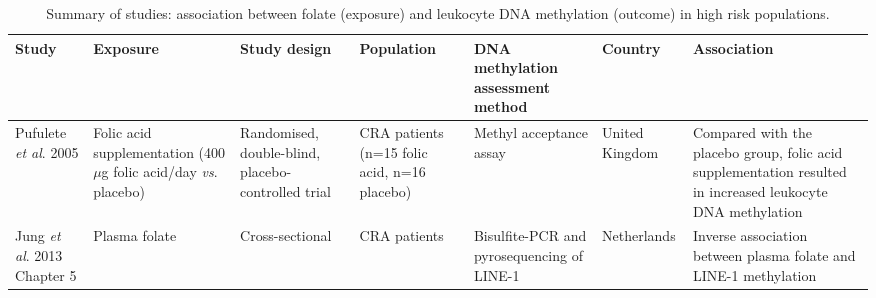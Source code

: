 \begin{sidewaystable}
\small
\caption{Summary of studies: association between folate (exposure) and leukocyte DNA methylation (outcome) in high risk populations.} 
\label{table7_6}
\renewcommand{\arraystretch}{1}
\begin{tabular}{L{2cm}C{2cm}C{2cm}C{2cm}C{2.5cm}C{1.5cm}C{3cm}} 
\hline\bfseries Study & \bfseries Exposure & \bfseries Study design & \bfseries Population & \bfseries DNA methylation assessment 
method & \bfseries Country & \bfseries Association\\
\hline

\parbox[t][3.6cm]{2cm}{\raggedright Pufulete \textit{et al}. 2005 \cite{c713}} &
\parbox[t][3.6cm]{2cm}{\centering Folic acid supplementation (400 $\mu$g folic acid/day \textit{vs}. placebo)} &
\parbox[t][3.6cm]{2cm}{\centering Randomised, double-blind, placebo-controlled trial} &
\parbox[t][3.6cm]{2cm}{ CRA patients (n=15 folic acid, n=16 placebo)} &
\parbox[t][3.6cm]{2.5cm}{\centering Methyl acceptance assay} &
\parbox[t][3.6cm]{1.5cm}{\centering United Kingdom} &
\parbox[t][3.6cm]{3cm}{\centering Compared with the placebo group, folic acid supplementation resulted in increased leukocyte DNA methylation}\\

\parbox[t][2.1cm]{2cm}{\raggedright Jung \emph{et al}. 2013 \cite{c714} Chapter 5} &
\parbox[t][2.1cm]{2cm}{\centering Plasma folate} &
\parbox[t][2.1cm]{2cm}{\centering Cross-sectional} &
\parbox[t][2.1cm]{2cm}{ CRA patients} &
\parbox[t][2.1cm]{2.5cm}{\centering Bisulfite-PCR and pyrosequencing of LINE-1} &
\parbox[t][2.1cm]{1.5cm}{\centering Netherlands} &
\parbox[t][2.1cm]{3cm}{\centering Inverse association between plasma folate and LINE-1 methylation}\\
\hline
\end{tabular}
\end{sidewaystable}

